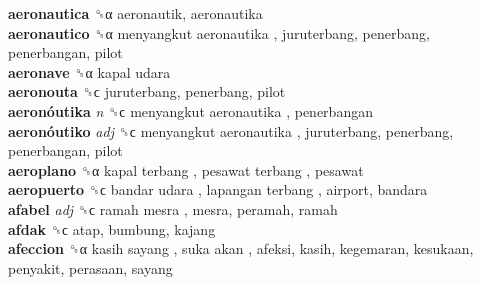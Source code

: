 \textbf{aeronautica} ␝α  aeronautik, aeronautika  \\
\textbf{aeronautico} ␝α   menyangkut aeronautika , juruterbang, penerbang, penerbangan, pilot  \\
\textbf{aeronave} ␝α   kapal udara   \\
\textbf{aeronouta} ␝ϲ  juruterbang, penerbang, pilot  \\
\textbf{aeronóutika} \emph{n}  ␝ϲ   menyangkut aeronautika , penerbangan  \\
\textbf{aeronóutiko} \emph{adj}  ␝ϲ   menyangkut aeronautika , juruterbang, penerbang, penerbangan, pilot  \\
\textbf{aeroplano} ␝α   kapal terbang ,  pesawat terbang , pesawat  \\
\textbf{aeropuerto} ␝ϲ   bandar udara ,  lapangan terbang , airport, bandara  \\
\textbf{afabel} \emph{adj}  ␝ϲ   ramah mesra , mesra, peramah, ramah  \\
\textbf{afdak} ␝ϲ  atap, bumbung, kajang  \\
\textbf{afeccion} ␝α   kasih sayang ,  suka akan , afeksi, kasih, kegemaran, kesukaan, penyakit, perasaan, sayang  \\
